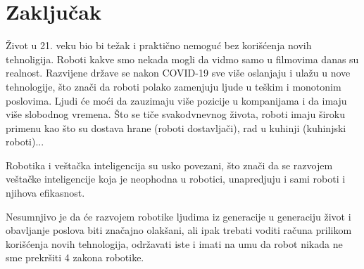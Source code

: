\documentclass{article}
\begin{document}
	\section{Zaključak}
 Život u 21. veku bio bi težak i praktično nemoguć bez korišćenja novih tehnoligija. Roboti kakve smo nekada mogli da vidmo samo u filmovima danas su realnost. Razvijene države se nakon COVID-19 sve više oslanjaju i ulažu u nove tehnologije, što znači da roboti polako zamenjuju ljude u teškim i monotonim poslovima. Ljudi će moći da zauzimaju više pozicije u kompanijama i da imaju više slobodnog vremena. Što se tiče svakodvnevnog života, roboti imaju široku primenu kao što su dostava hrane (roboti dostavljači), rad u kuhinji (kuhinjski roboti)...

 Robotika i veštačka inteligencija su usko povezani, što znači da se razvojem veštačke inteligencije koja je neophodna u robotici, unapredjuju i sami roboti i njihova efikasnost. 

 Nesumnjivo je da će razvojem robotike ljudima iz generacije u generaciju život i obavljanje poslova biti značajno olakšani, ali ipak trebati voditi računa prilikom korišćenja novih tehnologija, održavati iste i imati na umu da robot nikada ne sme prekršiti 4 zakona robotike.
	
\end{document}

